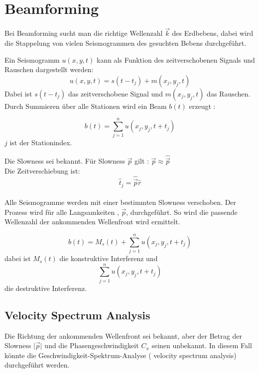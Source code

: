 \chapter{Beamforming}

Bei Beamforming sucht man die richtige Wellenzahl $\vec{k}$ des Erdbebens, dabei wird die Stappelung von vielen Seismogrammen des gesuchten Bebens durchgeführt. 

Ein Seismogramm $u(x,y,t)$ kann als Funktion des zeitverschobenen Signals und Rauschen dargestellt werden:
\begin{equation}
u(x,y,t) = s(t-t_{j})+m(x_{j},y_{j},t)
\end{equation}
 Dabei ist $s(t-t_{j})$ das zeitverschobene Signal und $m(x_{j},y_{j},t)$ das Rauschen.
 \\
 Durch Summieren über alle Stationen wird ein Beam $b(t)$ erzeugt :
 
 \begin{equation} b(t) = \sum_{j=1}^{n} u( x_{j},y_{j},t+t_{j})\end{equation}
 $j$ ist der Stationindex.
 
 Die Slowness sei bekannt. Für Slowness $\vec{p}$ gilt : $ \vec{p}\approx \hat{\vec{p}}$
 \\ Die Zeitverschiebung ist:  \begin{equation}\hat{t}_{j}=\hat{\vec{p}}\hat{r}\end{equation}
 \\ Alle Seismogramme werden mit einer bestimmten Slowness verschoben. Der Prozess wird für alle Langsamkeiten , $\vec{p}$, durchgeführt. So wird die passende Wellenzahl der ankommenden Wellenfront wird ermittelt. 
 

 \begin{equation}b(t) = M_{s}(t)+ \sum_{j=1}^{n} u( x_{j},y_{j},t+t_{j})\end{equation}
 dabei ist $M_{s}(t)$ die konstruktive Interferenz und \begin{equation*}\sum_{j=1}^{n} u( x_{j},y_{j},t+t_{j})
\end{equation*} die destruktive Interferenz.

\section{Velocity Spectrum Analysis}
Die Richtung der ankommenden Wellenfront sei bekannt, aber der Betrag der Slowness  $\vert\vec{p}\vert$ und die Phasengeschwindigkeit $C_{x}$ seinen unbekannt.
In diesem Fall könnte die Geschwindigkeit-Spektrum-Analyse ( velocity spectrum analysis) durchgeführt werden.


